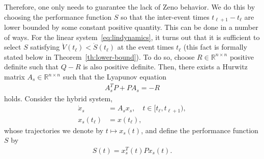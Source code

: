 \documentclass[]{book}
\newcommand{\real}{{\mathbb{R}}}
\begin{document}
Therefore, one only needs to guarantee the lack of Zeno behavior. We
do this by choosing the performance function $S$ so that the
inter-event times $t_{\ell+1} - t_\ell$ are lower bounded by some
constant positive quantity. This can be done in a number of ways.  For
the linear system~\eqref{eq:lindynamics}, it turns out that it is
sufficient to select $S$ satisfying $\dot{V}(t_\ell) <
\dot{S}(t_\ell)$ at the event times $t_\ell$ (this fact is formally
stated below in Theorem~\ref{th:lower-bound}).  To do so, choose $R
\in \real^{n \times n}$ positive definite such that $Q - R $ is also
positive definite. Then, there exists a Hurwitz matrix $A_s \in
\real^{n \times n}$ such that the Lyapunov equation
\begin{align*}
  A_s^T P + P A_s = -R 
\end{align*}
holds.  Consider the hybrid system,
\begin{align*}
  \dot{x}_s &= A_s x_s, \quad t \in [t_\ell, t_{\ell+1}),
  \\
  x_s(t_\ell) &= x(t_\ell),
\end{align*}
whose trajectories we denote by $t \mapsto x_s(t)$, and define the
performance function $S$ by
\begin{align*}
  S(t) = x_s^T(t) P x_s(t) .
\end{align*}

%
%
%
\end{document}

